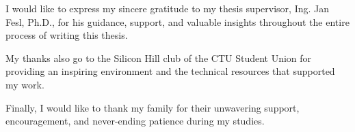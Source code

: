 \documentclass[english,bachelor,unicode,oneside]{ctufit-thesis}
\begin{document}
 
\frontmatter\frontmatterinit %

\thispagestyle{empty}\maketitle\thispagestyle{empty}\cleardoublepage %


\imprintpage %
\stopTOCentries

\begin{acknowledgmentpage}
I would like to express my sincere gratitude to my thesis supervisor, Ing. Jan Fesl, Ph.D., for his guidance, support, and valuable insights throughout the entire process of writing this thesis.

My thanks also go to the Silicon Hill club of the CTU Student Union for providing an inspiring environment and the technical resources that supported my work.

Finally, I would like to thank my family for their unwavering support, encouragement, and never-ending patience during my studies.
\end{acknowledgmentpage} 
\end{document}

